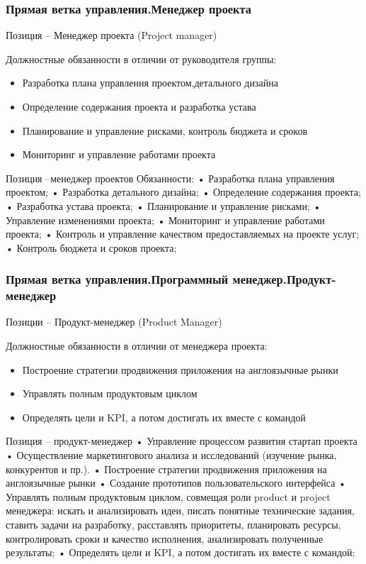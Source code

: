 \documentclass{../industrial-development}
\begin{document}
\begin{frame} \frametitle{Прямая ветка управления.Менеджер проекта}
 \begin{block}{}
  \alert{Позиция – Менеджер проекта (Project manager)}

Должностные обязанности в отличии от руководителя группы: 
  \end{block}
  \begin{itemize}
  \item Разработка плана управления проектом,детального дизайна
  \item Определение содержания проекта и разработка устава
 \item Планирование и управление рисками, контроль бюджета и сроков
  \item Мониторинг и управление работами проекта
  \end{itemize}
\end{frame}

\lecturenotes
Позиция –менеджер проектов
Обязанности:
 • Разработка плана управления проектом;
• Разработка детального дизайна;
• Определение содержания проекта;
• Разработка устава проекта;
• Планирование и управление рисками;
• Управление изменениями проекта;
• Мониторинг и управление работами проекта;
• Контроль и управление качеством предоставляемых на проекте услуг;
• Контроль бюджета и сроков проекта;



\begin{frame} \frametitle{Прямая ветка управления.Программный менеджер.Продукт-менеджер}
 \begin{block}{}
  \alert{Позиции – Продукт-менеджер (Product Manager)}

Должностные обязанности в отличии от менеджера проекта: 
  \end{block}
  \begin{itemize}
  \item Построение стратегии продвижения приложения на англоязычные рынки
  \item Управлять полным продуктовым циклом
 \item Определять цели и KPI, а потом достигать их вместе с командой
  \end{itemize}
\end{frame}

\lecturenotes

Позиция – продукт-менеджер
•	Управление процессом развития стартап проекта 
•	Осуществление маркетингового анализа и исследований (изучение рынка, конкурентов и пр.).
•	Построение стратегии продвижения приложения на англоязычные рынки
•	Создание прототипов пользовательского интерфейса 
•	Управлять полным продуктовым циклом, совмещая роли product и project менеджера: искать и анализировать идеи, писать понятные технические задания, ставить задачи на разработку, расставлять приоритеты, планировать ресурсы, контролировать сроки и качество исполнения, анализировать полученные результаты;
•	Определять цели и KPI, а потом достигать их вместе с командой;
\end{document}

